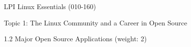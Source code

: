 LPI Linux Essentials (010-160)

Topic 1: The Linux Community and a Career in Open Source

1.2 Major Open Source Applications (weight: 2)

